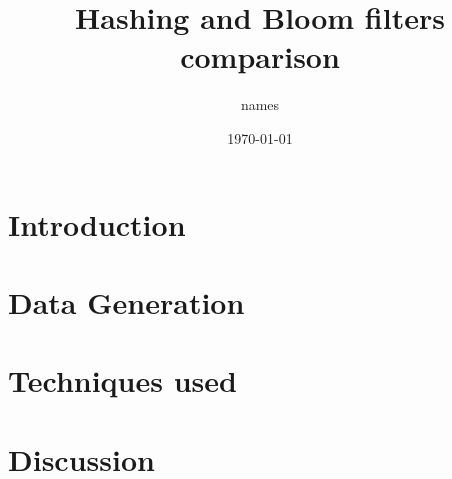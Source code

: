 \documentclass{article}
\title{Hashing and Bloom filters comparison}
\author{names}
\date{\today}
\begin{document}
    \maketitle
    \thispagestyle{empty}
    \begin{abstract}
        \lipsum[1]
    \end{abstract}


    \section*{Introduction}
        \lipsum[2]

    \section*{Data Generation}
        \lipsum[1]
    \section*{Techniques used}
        \lipsum[1]

    \section*{Discussion}
        \lipsum[1]
\end{document}
